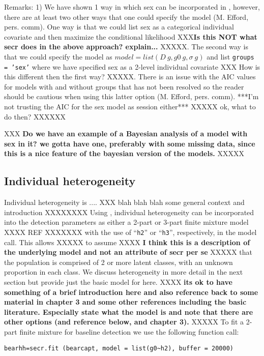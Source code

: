 Remarks: 1) We have shown 1 way in which sex can be incorporated in
\secr, however, there are at least two other ways that one could
specify the model (M. Efford, pers. comm).  One way is that we could
list sex as a categorical individual covariate and then maximize the
conditional likelihood XXX{\bf Is this NOT what secr does in the above
  approach? explain...} XXXXX.  The second way is that we could specify the
model as $model = list(D~g, g0~g, \sigma~g)$ and list \mbox{\tt groups = 'sex'}
where we have specified sex as a 2-level individual covariate XXX How
is this different then the first way? XXXXX.  There
is an issue with the AIC values for models with and without groups
that has not been resolved so the reader should be cautious when using
this latter option (M. Efford, pers. comm).  ***I'm not trusting the
AIC for the sex model as session either*** XXXXX ok, what to do then? XXXXXX


XXX 
{\bf Do we have an example of a Bayesian analysis of a model with sex in it? 
we gotta have one, preferably with some missing data, since this is a
nice feature of the bayesian version of the models. }
XXXXX


\subsection{Individual heterogeneity}

Individual heterogeneity is .... XXX blah blah blah some general
context and introduction XXXXXXXX
Using \secr,  individual heterogeneity can be incorporated
into the detection parameters as either a 2-part or 3-part finite
mixture model XXXX REF XXXXXXX with the use of ``\mbox{\tt h2}'' or
``\mbox{\tt h3}'', respectively, in the
model call.   This allows  XXXXX to assume  XXXX
{\bf I
think this is a description of the underlying model and not an
attribute of secr per se} XXXXX that the population is
comprised of 2 or more latent classes, with an unknown proportion in
each class.  We discuss heterogeneity in more detail in the next
section but provide just the basic model for \secr here. 
XXXX 
{\bf its ok
to have something of a brief introduction here and also reference back
to some material in chapter 3 and some other references including the
basic literature. Especially state what the model is and note that
there are other options (and reference below, and chapter 3). }
XXXXX
To fit a
2-part finite mixture for baseline detection we use the following
function call:

\begin{verbatim} 
bearhh=secr.fit (bearcapt, model = list(g0~h2), buffer = 20000)
\end{verbatim} 

